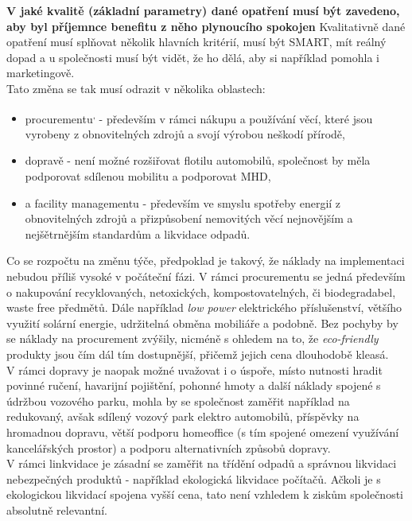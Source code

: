 \textbf{V jaké kvalitě (základní parametry) dané opatření musí být zavedeno, aby byl příjemnce benefitu z něho plynoucího spokojen} Kvalitativně dané opatření musí splňovat několik hlavních kritérií, musí být SMART, mít reálný dopad a u společnosti musí být vidět, že ho dělá, aby si například pomohla i marketingově.\\

Tato změna se tak musí odrazit v několika oblastech:

\begin{itemize}
	\item procurementu\textsuperscript{,} - především v rámci nákupu a používání věcí, které jsou vyrobeny z obnovitelných zdrojů a svojí výrobou neškodí přírodě,
	\item dopravě - není možné rozšiřovat flotilu automobilů, společnost by měla podporovat sdílenou mobilitu a podporovat MHD,
	\item a facility managementu - především ve smyslu spotřeby energií z obnovitelných zdrojů a přizpůsobení nemovitých věcí nejnovějším a nejšětrnějším standardům a likvidace odpadů.	
\end{itemize}

Co se rozpočtu na změnu týče, předpoklad je takový, že náklady na implementaci nebudou příliš vysoké v počáteční fázi. V rámci procurementu se jedná především o nakupování recyklovaných, netoxických, kompostovatelných, či biodegradabel, waste free předmětů. Dále například \textit{low power} elektrického příslušenství, většího využití solární energie, udržitelná obměna mobiliáře a podobně. Bez pochyby by se náklady na procurement zvýšily, nicméně s ohledem na to, že \textit{eco-friendly} produkty jsou čím dál tím dostupnější, přičemž jejich cena dlouhodobě kleasá.\\

V rámci dopravy je naopak možné uvažovat i o úspoře, místo nutnosti hradit povinné ručení, havarijní pojištění, pohonné hmoty a další náklady spojené s údržbou vozového parku, mohla by se společnost zaměřit například na redukovaný, avšak sdílený vozový park elektro automobilů, příspěvky na hromadnou dopravu, větší podporu homeoffice (s tím spojené omezení využívání kancelářských prostor) a podporu alternativních způsobů dopravy.\\

V rámci linkvidace je zásadní se zaměřit na třídění odpadů a správnou likvidaci nebezpečných produktů - například ekologická likvidace počítačů. Ačkoli je s ekologickou likvidací spojena vyšší cena, tato není vzhledem k ziskům společnosti absolutně relevantní.\\



